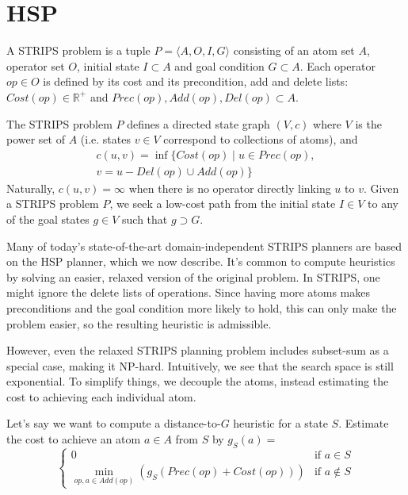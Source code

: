 \documentclass[letterpaper]{article}
\begin{document}
\section{HSP}

A STRIPS problem is a tuple $P = \langle A,O,I,G\rangle$ consisting of an atom set $A$, operator set $O$, initial state $I \subset A$ and goal condition $G \subset A$.
Each operator $op\in O$ is defined by its cost and its precondition, add and delete lists: $Cost(op) \in \mathbb{R}^+$ and $Prec(op),Add(op),Del(op) \subset A$.

The STRIPS problem $P$ defines a directed state graph $(V,c)$ where $V$ is the power set of $A$ (i.e. states $v\in V$ correspond to collections of atoms), and
\begin{eqnarray*} c(u,v) = \inf\{Cost(op) \mid u\in Prec(op),
\\v = u - Del(op) \cup Add(op)\} \end{eqnarray*}
Naturally, $c(u,v) = \infty$ when there is no operator directly linking $u$ to $v$.
Given a STRIPS problem $P$, we seek a low-cost path from the initial state $I\in V$ to any of the goal states $g\in V$ such that $g \supset G$.

Many of today's state-of-the-art domain-independent STRIPS planners are based on the HSP planner, which we now describe.
It's common to compute heuristics by solving an easier, relaxed version of the original problem. In STRIPS, one might ignore the delete lists of operations.
Since having more atoms makes preconditions and the goal condition more likely to hold, this can only make the problem easier, so the resulting heuristic is admissible.

However, even the relaxed STRIPS planning problem includes subset-sum as a special case, making it NP-hard.
Intuitively, we see that the search space is still exponential.
To simplify things, we decouple the atoms, instead estimating the cost to achieving each individual atom.

Let's say we want to compute a distance-to-$G$ heuristic for a state $S$. Estimate the cost to achieve an atom $a\in A$ from $S$ by $g_S(a) = $
\[\begin{cases} 0  &\mbox{if } a \in S
\\ \min_{op,a\in Add(op)} \left(g_S(Prec(op) + Cost(op))\right)  &\mbox{if } a \notin S \end{cases}\]
\end{document}
